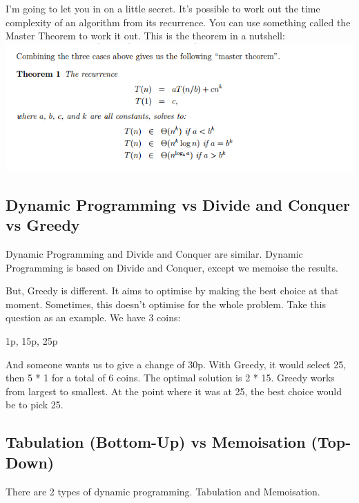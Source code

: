 \documentclass{article}
\begin{document}
I'm going to let you in on a little secret. It's possible to work out the time complexity of an algorithm from its recurrence. You can use something called the Master Theorem to work it out. This is the theorem in a nutshell:
\includegraphics[width=\textwidth,height=\textheight,keepaspectratio]{master.png}
\newpage
\subsection{Dynamic Programming vs Divide and Conquer vs Greedy}
Dynamic Programming and Divide and Conquer are similar. Dynamic Programming is based on Divide and Conquer, except we memoise the results.

But, Greedy is different. It aims to optimise by making the best choice at that moment. Sometimes, this doesn't optimise for the whole problem. Take this question as an example. We have 3 coins:

1p, 15p, 25p

And someone wants us to give a change of 30p. With Greedy, it would select 25, then 5 * 1 for a total of 6 coins. The optimal solution is 2 * 15. Greedy works from largest to smallest. At the point where it was at 25, the best choice would be to pick 25. 

\newpage
\subsection{Tabulation (Bottom-Up) vs Memoisation (Top-Down)}
There are 2 types of dynamic programming. Tabulation and Memoisation. 
\end{document}
